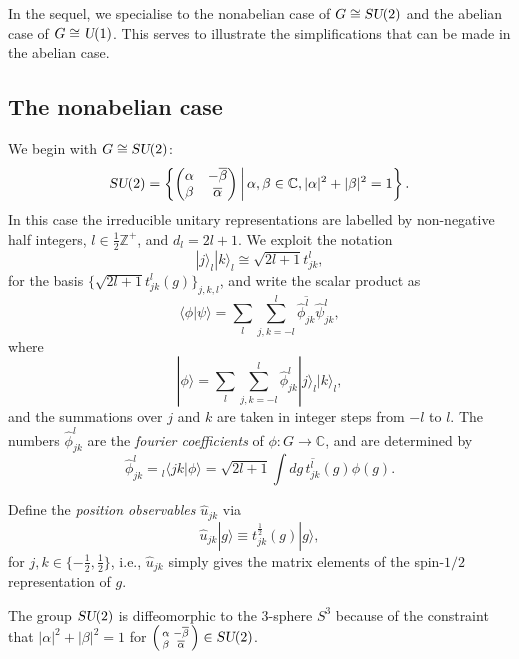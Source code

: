 \documentclass[12pt]{amsart}
\def\su2{\textsl{SU}(2)}
\def\uone{\textsl{U}(1)}
\theoremstyle{definition}
\theoremstyle{remark}
\numberwithin{equation}{section}
\begin{document}
In the sequel, we specialise to the nonabelian case of $G \cong \su2$
and the abelian case of $G \cong \uone$. This serves to illustrate the simplifications
that can be made in the abelian case.

\subsection{The nonabelian case}
We begin with $G\cong \su2$:
\begin{equation}
	\su2 = \left\{\begin{pmatrix} \alpha & -\overline{\beta} \\ \beta & \overline{\alpha}\end{pmatrix}\,\middle|\, \alpha,\beta\in \mathbb{C}, |\alpha|^2+|\beta|^2 = 1\right\}.
\end{equation}
In this case the irreducible unitary representations are labelled by non-negative half integers, $l \in \frac12\mathbb{Z}^+$, and $d_l = 2l+1$.
We exploit the notation
\begin{equation}
	|j\rangle_l|k\rangle_l \cong \sqrt{2l+1} t_{jk}^l,
\end{equation}
for the basis $\{\sqrt{2l+1} t_{jk}^l(g)\}_{j,k,l}$, and write the scalar product as
\begin{equation}
	\langle \phi|\psi\rangle = \sum_{l}\sum_{j,k = -l}^l \overline{\widehat{\phi}_{jk}^l}\widehat{\psi}_{jk}^l,
\end{equation}
where 
\begin{equation}
	|\phi\rangle = \sum_{l}\sum_{j,k=-l}^l\widehat{\phi}_{jk}^l |j\rangle_l|k\rangle_l,
\end{equation}
and the summations over $j$ and $k$ are taken in integer steps from $-l$ to $l$. The numbers $\widehat{\phi}_{jk}^l$ are the \emph{fourier coefficients} of $\phi:G\rightarrow \mathbb{C}$, and are determined by
\begin{equation}
	\widehat{\phi}_{jk}^l = {_l\langle jk|\phi\rangle} = \sqrt{2l+1}\int dg \, \overline{t^l_{jk}}(g) \phi(g).
\end{equation}

Define the \emph{position observables} $\widehat{u}_{jk}$ via
\begin{equation}
	\widehat{u}_{jk}|g\rangle \equiv t_{jk}^{\frac12}(g)|g\rangle,
\end{equation} 
for $j,k \in \{-\frac12, \frac12\}$, i.e., $\widehat{u}_{jk}$ simply gives the matrix elements of the spin-$1/2$ representation of $g$.

The group $\su2$ is diffeomorphic to the $3$-sphere $S^3$ because of the constraint that $|\alpha|^2 + |\beta|^2 = 1$ for $\left(\begin{smallmatrix}\alpha & -\overline{\beta} \\ \beta & \overline{\alpha} \end{smallmatrix}\right) \in \su2$. 
\end{document}
